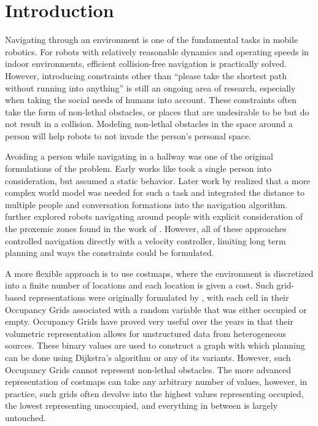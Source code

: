 \section{Introduction}
Navigating through an environment is one of the fundamental tasks in mobile robotics. For robots with relatively reasonable dynamics and operating speeds in indoor environments, efficient collision-free navigation is practically solved. However, introducing constraints other than ``please take the shortest path without running into anything'' is still an ongoing area of research, especially when taking the social needs of humans into account. These constraints often take the form of non-lethal obstacles, or places that are undesirable to be but do not result in a collision. Modeling non-lethal obstacles in the space around a person will help robots to not invade the person's personal space. 

Avoiding a person while navigating in a hallway was one of the original formulations of the problem. Early works like \citet{yoda1997} took a single person into consideration, but assumed a static behavior. Later work by \citet{christensen2004} realized that a more complex world model was needed for such a task and integrated the distance to multiple people and conversation formations into the navigation algorithm. 
\citet{christensen2005} further explored robots navigating around people with explicit consideration of the proxemic zones found in the work of \citet{hall1969}. However, all of these approaches controlled navigation directly with a velocity controller, limiting long term planning and ways the constraints could be formulated. 

A more flexible approach is to use costmaps, where the environment is discretized into a finite number of locations and each location is given a cost. Such grid-based representations were originally formulated by \citet{matthies1988}, with each cell in their Occupancy Grids associated with a random variable that was either occupied or empty. Occupancy Grids have proved very useful over the years in that their volumetric representation allows for unstructured data from heterogeneous sources. These binary values are used to construct a graph with which planning can be done using Dijkstra's algorithm or any of its variants. However, such Occupancy Grids cannot represent non-lethal obstacles. The more advanced representation of costmaps can take any arbitrary number of values, however, in practice, such grids often devolve into the highest values representing occupied, the lowest representing unoccupied, and everything in between is largely untouched. 

